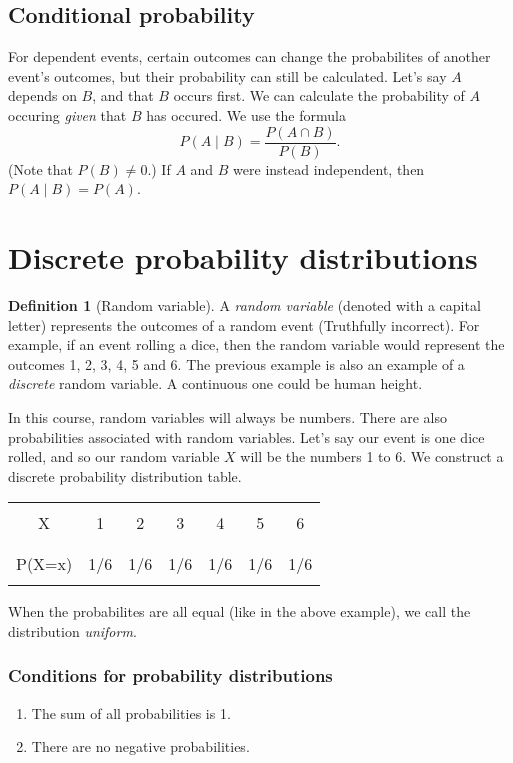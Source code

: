 \documentclass[12pt]{book}
\theoremstyle{definition}
\newtheorem{defi}[theo]{Definition}
\begin{document}
\subsection{Conditional probability}
  For dependent events, certain outcomes can change the probabilites of another event's outcomes, but their probability can still
  be calculated. Let's say $A$ depends on $B$, and that $B$ occurs first. We can calculate the probability of $A$ occuring \textit{given}
  that $B$ has occured. We use the formula
  \[P(A\mid B)=\frac{P(A\cap B)}{P(B)}.\]
  (Note that $P(B)\neq 0$.) If $A$ and $B$ were instead independent, then $P(A\mid B)=P(A)$.
\section{Discrete probability distributions}
  \begin{defi}[Random variable]
    A \textit{random variable} (denoted with a capital letter) represents the outcomes of a random event (Truthfully incorrect). For example, if an event rolling a dice, then the random
    variable would represent the outcomes 1, 2, 3, 4, 5 and 6. The previous example is also an example of a \textit{discrete} random
    variable. A continuous one could be human height. 
  \end{defi}
  In this course, random variables will always be numbers. There are also probabilities associated with random variables. Let's say
  our event is one dice rolled, and so our random variable $X$ will be the numbers 1 to 6. We construct a 
  discrete probability distribution table.
  \begin{center}\begin{tabular}{|c|c|c|c|c|c|c|}
  \hline &&&&&&\\[-0.6em]
  X & 1 & 2 & 3 & 4 & 5 & 6 \\[-0.6em] &&&&&& \\
  \hline
  &&&&&&\\[-0.6em]
  P(X=x) & 1/6 & 1/6 & 1/6 & 1/6 & 1/6 & 1/6\\[-0.6em] &&&&&& \\
  \hline
  \end{tabular}\end{center}
  When the probabilites are all equal (like in the above example), we call the distribution \textit{uniform}.
\subsubsection*{Conditions for probability distributions}
  \begin{enumerate}
    \item The sum of all probabilities is 1.
    \item There are no negative probabilities.
  \end{enumerate}
\end{document}
